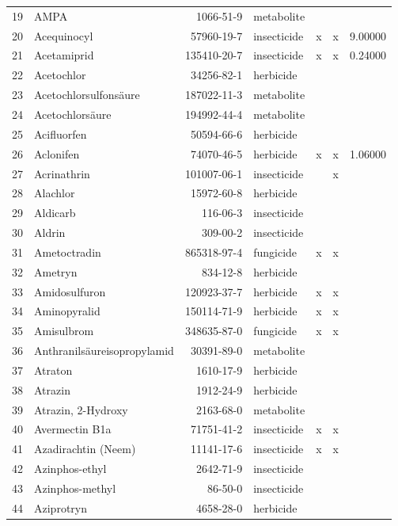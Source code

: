 \begin{longtable}{lp{4cm}rlp{1.3cm}p{1.3cm}p{1.5cm}}
  19 & AMPA & 1066-51-9 & metabolite &  &  &  \\ 
  20 & Acequinocyl & 57960-19-7 & insecticide & x & x & 9.00000 \\ 
  21 & Acetamiprid & 135410-20-7 & insecticide & x & x & 0.24000 \\ 
  22 & Acetochlor & 34256-82-1 & herbicide &  &  &  \\ 
  23 & Acetochlorsulfonsäure & 187022-11-3 & metabolite &  &  &  \\ 
  24 & Acetochlorsäure & 194992-44-4 & metabolite &  &  &  \\ 
  25 & Acifluorfen & 50594-66-6 & herbicide &  &  &  \\ 
  26 & Aclonifen & 74070-46-5 & herbicide & x & x & 1.06000 \\ 
  27 & Acrinathrin & 101007-06-1 & insecticide &  & x &  \\ 
  28 & Alachlor & 15972-60-8 & herbicide &  &  &  \\ 
  29 & Aldicarb & 116-06-3 & insecticide &  &  &  \\ 
  30 & Aldrin & 309-00-2 & insecticide &  &  &  \\ 
  31 & Ametoctradin & 865318-97-4 & fungicide & x & x &  \\ 
  32 & Ametryn & 834-12-8 & herbicide &  &  &  \\ 
  33 & Amidosulfuron & 120923-37-7 & herbicide & x & x &  \\ 
  34 & Aminopyralid & 150114-71-9 & herbicide & x & x &  \\ 
  35 & Amisulbrom & 348635-87-0 & fungicide & x & x &  \\ 
  36 & Anthranilsäureisopropylamid & 30391-89-0 & metabolite &  &  &  \\ 
  37 & Atraton & 1610-17-9 & herbicide &  &  &  \\ 
  38 & Atrazin & 1912-24-9 & herbicide &  &  &  \\ 
  39 & Atrazin, 2-Hydroxy & 2163-68-0 & metabolite &  &  &  \\ 
  40 & Avermectin B1a & 71751-41-2 & insecticide & x & x &  \\ 
  41 & Azadirachtin (Neem) & 11141-17-6 & insecticide & x & x &  \\ 
  42 & Azinphos-ethyl & 2642-71-9 & insecticide &  &  &  \\ 
  43 & Azinphos-methyl & 86-50-0 & insecticide &  &  &  \\ 
  44 & Aziprotryn & 4658-28-0 & herbicide &  &  &  \\ 

\end{longtable}

